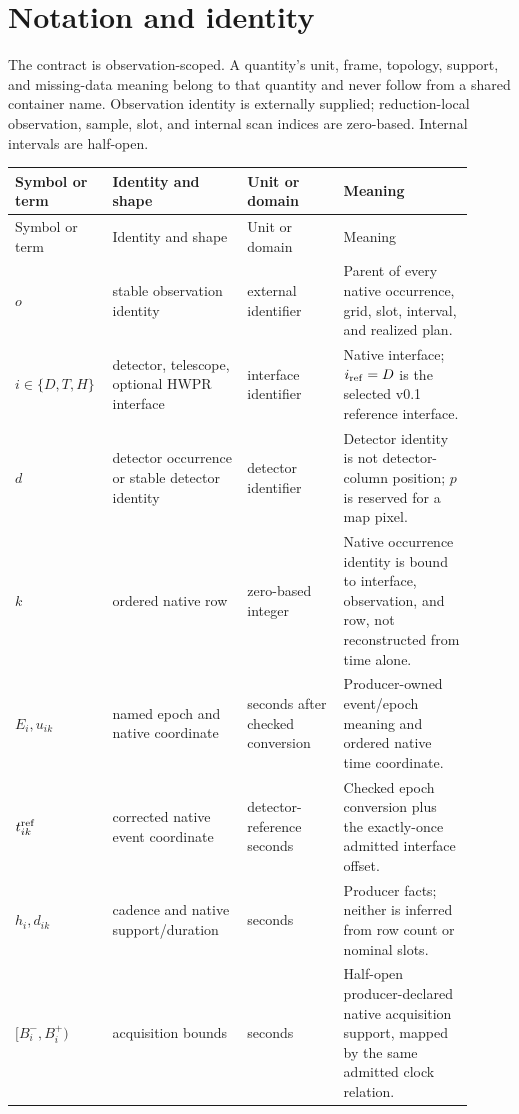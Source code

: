 \section{Notation and identity}
\label{sec:notation}

The contract is observation-scoped.  A quantity's unit, frame, topology,
support, and missing-data meaning belong to that quantity and never follow
from a shared container name.  Observation identity is externally supplied;
reduction-local observation, sample, slot, and internal scan indices are
zero-based.  Internal intervals are half-open.

\begin{longtable}{L{0.16\linewidth}L{0.28\linewidth}L{0.20\linewidth}L{0.27\linewidth}}
\toprule
Symbol or term & Identity and shape & Unit or domain & Meaning\\
\midrule
\endfirsthead
\toprule
Symbol or term & Identity and shape & Unit or domain & Meaning\\
\midrule
\endhead
\(o\) & stable observation identity & external identifier & Parent of every native occurrence, grid, slot, interval, and realized plan.\\
\(i\in\{D,T,H\}\) & detector, telescope, optional HWPR interface & interface identifier & Native interface; \(i_{\rm ref}=D\) is the selected v0.1 reference interface.\\
\(d\) & detector occurrence or stable detector identity & detector identifier & Detector identity is not detector-column position; \(p\) is reserved for a map pixel.\\
\(k\) & ordered native row & zero-based integer & Native occurrence identity is bound to interface, observation, and row, not reconstructed from time alone.\\
\(E_i,u_{ik}\) & named epoch and native coordinate & seconds after checked conversion & Producer-owned event/epoch meaning and ordered native time coordinate.\\
\(t_{ik}^{\rm ref}\) & corrected native event coordinate & detector-reference seconds & Checked epoch conversion plus the exactly-once admitted interface offset.\\
\(h_i,d_{ik}\) & cadence and native support/duration & seconds & Producer facts; neither is inferred from row count or nominal slots.\\
\([B_i^-,B_i^+)\) & acquisition bounds & seconds & Half-open producer-declared native acquisition support, mapped by the same admitted clock relation.\\

\end{longtable}
